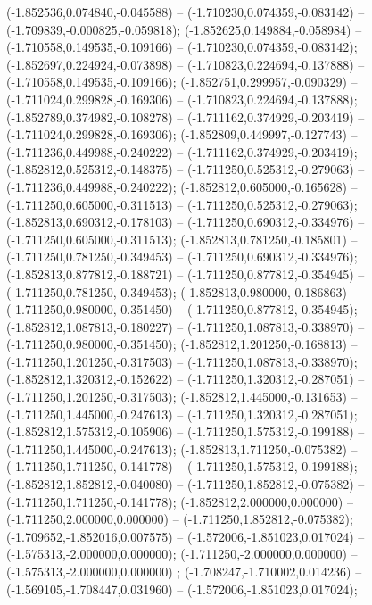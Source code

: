  (-1.852536,0.074840,-0.045588) -- (-1.710230,0.074359,-0.083142) -- (-1.709839,-0.000825,-0.059818);
 (-1.852625,0.149884,-0.058984) -- (-1.710558,0.149535,-0.109166) -- (-1.710230,0.074359,-0.083142);
 (-1.852697,0.224924,-0.073898) -- (-1.710823,0.224694,-0.137888) -- (-1.710558,0.149535,-0.109166);
 (-1.852751,0.299957,-0.090329) -- (-1.711024,0.299828,-0.169306) -- (-1.710823,0.224694,-0.137888);
 (-1.852789,0.374982,-0.108278) -- (-1.711162,0.374929,-0.203419) -- (-1.711024,0.299828,-0.169306);
 (-1.852809,0.449997,-0.127743) -- (-1.711236,0.449988,-0.240222) -- (-1.711162,0.374929,-0.203419);
 (-1.852812,0.525312,-0.148375) -- (-1.711250,0.525312,-0.279063) -- (-1.711236,0.449988,-0.240222);
 (-1.852812,0.605000,-0.165628) -- (-1.711250,0.605000,-0.311513) -- (-1.711250,0.525312,-0.279063);
 (-1.852813,0.690312,-0.178103) -- (-1.711250,0.690312,-0.334976) -- (-1.711250,0.605000,-0.311513);
 (-1.852813,0.781250,-0.185801) -- (-1.711250,0.781250,-0.349453) -- (-1.711250,0.690312,-0.334976);
 (-1.852813,0.877812,-0.188721) -- (-1.711250,0.877812,-0.354945) -- (-1.711250,0.781250,-0.349453);
 (-1.852813,0.980000,-0.186863) -- (-1.711250,0.980000,-0.351450) -- (-1.711250,0.877812,-0.354945);
 (-1.852812,1.087813,-0.180227) -- (-1.711250,1.087813,-0.338970) -- (-1.711250,0.980000,-0.351450);
 (-1.852812,1.201250,-0.168813) -- (-1.711250,1.201250,-0.317503) -- (-1.711250,1.087813,-0.338970);
 (-1.852812,1.320312,-0.152622) -- (-1.711250,1.320312,-0.287051) -- (-1.711250,1.201250,-0.317503);
 (-1.852812,1.445000,-0.131653) -- (-1.711250,1.445000,-0.247613) -- (-1.711250,1.320312,-0.287051);
 (-1.852812,1.575312,-0.105906) -- (-1.711250,1.575312,-0.199188) -- (-1.711250,1.445000,-0.247613);
 (-1.852813,1.711250,-0.075382) -- (-1.711250,1.711250,-0.141778) -- (-1.711250,1.575312,-0.199188);
 (-1.852812,1.852812,-0.040080) -- (-1.711250,1.852812,-0.075382) -- (-1.711250,1.711250,-0.141778);
 (-1.852812,2.000000,0.000000) -- (-1.711250,2.000000,0.000000) -- (-1.711250,1.852812,-0.075382);
 (-1.709652,-1.852016,0.007575) -- (-1.572006,-1.851023,0.017024) -- (-1.575313,-2.000000,0.000000);
 (-1.711250,-2.000000,0.000000) -- (-1.575313,-2.000000,0.000000) ;
 (-1.708247,-1.710002,0.014236) -- (-1.569105,-1.708447,0.031960) -- (-1.572006,-1.851023,0.017024);
